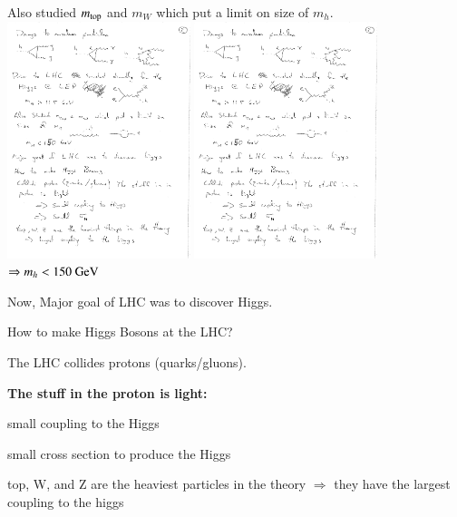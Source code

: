 {Also studied $m_{\textrm{top}}$ and $m_W$ which put a limit on size of $m_h$.
\bc
\includegraphics[width=0.4\textwidth]{./wHLoop.pdf}
\includegraphics[width=0.4\textwidth]{./topHLoop.pdf}
\ec
$\Rightarrow m_h < 150\ \textrm{GeV}$

\lineacross

Now, Major goal of LHC was to discover Higgs. 

How to make Higgs Bosons at the LHC? 

The LHC collides protons (quarks/gluons). 

\textbf{The stuff in the proton is light:}
\bi
\item[$\Rightarrow$] small coupling to the Higgs
\item[$\Rightarrow$] small cross section to produce the Higgs
\ei

top, W, and Z are the heaviest particles in the theory
$\Rightarrow$  they have the largest coupling to the higgs

}
